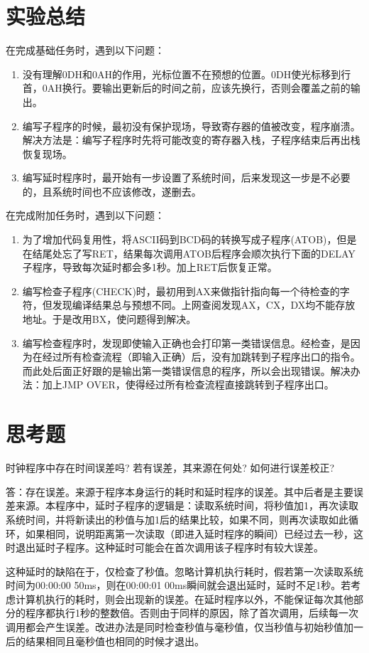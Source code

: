 \documentclass[12pt, a4paper, oneside]{ctexart}
\begin{document}
\section{实验总结}
在完成基础任务时，遇到以下问题：
\begin{enumerate}
    \item 没有理解0DH和0AH的作用，光标位置不在预想的位置。0DH使光标移到行首，0AH换行。要输出更新后的时间之前，应该先换行，否则会覆盖之前的输出。
    \item 编写子程序的时候，最初没有保护现场，导致寄存器的值被改变，程序崩溃。解决方法是：编写子程序时先将可能改变的寄存器入栈，子程序结束后再出栈恢复现场。
    \item 编写延时程序时，最开始有一步设置了系统时间，后来发现这一步是不必要的，且系统时间也不应该修改，遂删去。
\end{enumerate}
在完成附加任务时，遇到以下问题：
\begin{enumerate}
    \item 为了增加代码复用性，将ASCII码到BCD码的转换写成子程序(ATOB)，但是在结尾处忘了写RET，结果每次调用ATOB后程序会顺次执行下面的DELAY子程序，导致每次延时都会多1秒。加上RET后恢复正常。
    \item 编写检查子程序(CHECK)时，最初用到AX来做指针指向每一个待检查的字符，但发现编译结果总与预想不同。上网查阅发现AX，CX，DX均不能存放地址。于是改用BX，使问题得到解决。
    \item 编写检查程序时，发现即使输入正确也会打印第一类错误信息。经检查，是因为在经过所有检查流程（即输入正确）后，没有加跳转到子程序出口的指令。而此处后面正好跟的是输出第一类错误信息的程序，所以会出现错误。解决办法：加上JMP OVER，使得经过所有检查流程直接跳转到子程序出口。
\end{enumerate}
\section{思考题}
时钟程序中存在时间误差吗? 若有误差，其来源在何处? 如何进行误差校正?

答：存在误差。来源于程序本身运行的耗时和延时程序的误差。其中后者是主要误差来源。本程序中，延时子程序的逻辑是：读取系统时间，将秒值加1，再次读取系统时间，并将新读出的秒值与加1后的结果比较，如果不同，则再次读取如此循环，如果相同，说明距离第一次读取（即进入延时程序的瞬间）已经过去一秒，这时退出延时子程序。这种延时可能会在首次调用该子程序时有较大误差。

这种延时的缺陷在于，仅检查了秒值。忽略计算机执行耗时，假若第一次读取系统时间为00:00:00 50ms，则在00:00:01 00ms瞬间就会退出延时，延时不足1秒。若考虑计算机执行的耗时，则会出现新的误差。在延时程序以外，不能保证每次其他部分的程序都执行1秒的整数倍。否则由于同样的原因，除了首次调用，后续每一次调用都会产生误差。改进办法是同时检查秒值与毫秒值，仅当秒值与初始秒值加一后的结果相同且毫秒值也相同的时候才退出。
\end{document}
